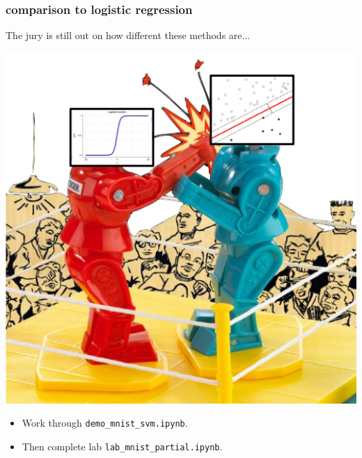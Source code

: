 \documentclass[handout,compress]{beamer}
\begin{document}
\begin{frame}
	\frametitle{comparison to logistic regression}
	The jury is still out on how different these methods are...
	\begin{center}
		\includegraphics[width=.4\textwidth]{faceoff.png}
	\end{center}
	\begin{itemize}
		\item Work through \texttt{demo\_mnist\_svm.ipynb}. 
		\item Then complete lab \texttt{lab\_mnist\_partial.ipynb}.
	\end{itemize}
\end{frame}
\end{document}
